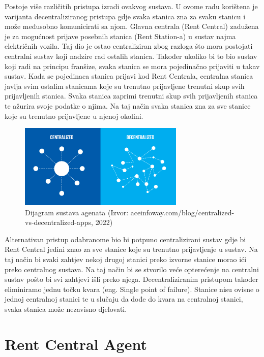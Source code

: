 \documentclass{foi}
\begin{document}
Postoje više različitih pristupa izradi ovakvog sustava. U ovome radu korištena je varijanta decentraliziranog pristupa gdje svaka stanica zna za svaku stanicu i može međusobno komunicirati sa njom. Glavna centrala (Rent Central) zadužena je za mogućnost prijave posebnih stanica (Rent Station-a) u sustav najma električnih vozila. Taj dio je ostao centraliziran zbog razloga što mora postojati centralni sustav koji nadzire rad ostalih stanica. Također ukoliko bi to bio sustav koji radi na principu franšize, svaka stanica se mora pojedinačno prijaviti u takav sustav. Kada se pojedinaca stanica prijavi kod Rent Centrala, centralna stanica javlja svim ostalim stanicama koje su trenutno prijavljene trenutni skup svih prijavljenih stanica. Svaka stanica zaprimi trenutni skup svih prijavljenih stanica te ažurira svoje podatke o njima. Na taj način svaka stanica zna za sve stanice koje su trenutno prijavljene u njenoj okolini.

\begin{figure}[h!]
	\centering
	\includegraphics[width=0.7\textwidth]{slike/decentralized.jpg}
	\caption{Dijagram sustava agenata (Izvor: aceinfoway.com/blog/centralized-vs-decentralized-apps, 2022)}
\end{figure}

Alternativan pristup odabranome bio bi potpuno centralizirani sustav gdje bi Rent Central jedini znao za sve stanice koje su trenutno prijavljenje u sustav. Na taj način bi svaki zahtjev nekoj drugoj stanici preko izvorne stanice morao ići preko centralnog sustava. Na taj način bi se stvorilo veće opterećenje na centralni sustav pošto bi svi zahtjevi išli preko njega. Decentraliziranim pristupom također eliminiramo jednu točku kvara (eng. Single point of failure). Stanice nisu ovisne o jednoj centralnoj stanici te u slučaju da dođe do kvara na centralnoj stanici, svaka stanica može nezavisno djelovati.
\pagebreak

\section{Rent Central Agent}
\end{document}
